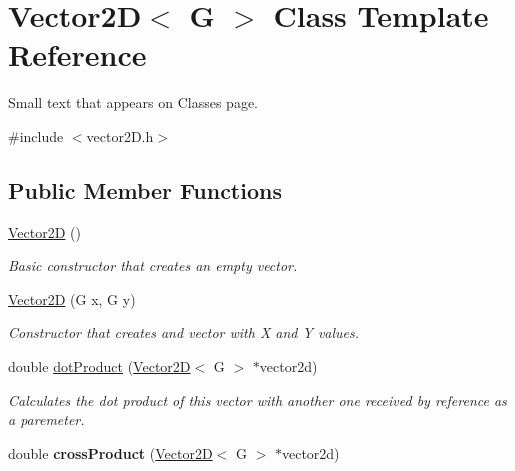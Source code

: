 \hypertarget{class_vector2_d}{}\section{Vector2\+D$<$ G $>$ Class Template Reference}
\label{class_vector2_d}


Small text that appears on Classes page.  




{\ttfamily \#include $<$vector2\+D.\+h$>$}

\subsection*{Public Member Functions}
\begin{DoxyCompactItemize}
\item 
\hypertarget{class_vector2_d_a3bce991141a2cfd9c381651c06d2bee5}{}\hyperlink{class_vector2_d_a3bce991141a2cfd9c381651c06d2bee5}{Vector2\+D} ()\label{class_vector2_d_a3bce991141a2cfd9c381651c06d2bee5}

\begin{DoxyCompactList}\small\item\em Basic constructor that creates an empty vector. \end{DoxyCompactList}\item 
\hypertarget{class_vector2_d_a25ac574bd1a4deb41a9b198afd5f2787}{}\hyperlink{class_vector2_d_a25ac574bd1a4deb41a9b198afd5f2787}{Vector2\+D} (G x, G y)\label{class_vector2_d_a25ac574bd1a4deb41a9b198afd5f2787}

\begin{DoxyCompactList}\small\item\em Constructor that creates and vector with X and Y values. \end{DoxyCompactList}\item 
\hypertarget{class_vector2_d_abbf351182e5d3e725a0b75e82435b846}{}double \hyperlink{class_vector2_d_abbf351182e5d3e725a0b75e82435b846}{dot\+Product} (\hyperlink{class_vector2_d}{Vector2\+D}$<$ G $>$ $\ast$vector2d)\label{class_vector2_d_abbf351182e5d3e725a0b75e82435b846}

\begin{DoxyCompactList}\small\item\em Calculates the dot product of this vector with another one received by reference as a paremeter. \end{DoxyCompactList}\item 
\hypertarget{class_vector2_d_a69f615ea74f194e92784d76a71007405}{}double {\bfseries cross\+Product} (\hyperlink{class_vector2_d}{Vector2\+D}$<$ G $>$ $\ast$vector2d)\label{class_vector2_d_a69f615ea74f194e92784d76a71007405}


\end{DoxyCompactItemize}
